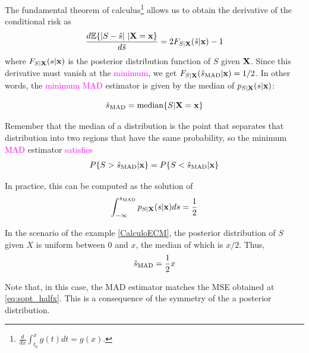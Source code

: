 The fundamental theorem of calculus\footnote{$\frac{d}{d x} \int_{t_0}^x g(t) dt = g(x)$.} allows us to obtain the derivative of the conditional risk as
\begin{equation}
\frac{d \mathbb{E}\{|S - \hat s|~|{\bf X} = {\bf x} \}}{d \hat s} 
    = 2 F_{S|{\bf X}}(\hat s|{\bf x}) - 1
\end{equation}
where $F_{S|{\bf X}}(s|{\bf x})$ is the posterior distribution function of $S$ given ${\bf X}$. Since this derivative must vanish at the \textcolor{magenta}{minimum}, we get $F_{S|{\bf X}}(\hat s_{\text{MAD}}|{\bf x}) = 1/2$. In other words, the \textcolor{magenta}{minimum MAD} estimator is given by the median of $p_{S|{\bf X}}(s|{\bf x})$:

\begin{framed}
\begin{equation}
\label{ec:estimador_MAD_final}
\hat s_{\text{MAD}} = \text{median}\{S|{\bf X} ={\bf x}\}
\end{equation}
\end{framed}

Remember that the median of a distribution is the point that separates that distribution into two regions that have the same probability, so the minimum \textcolor{magenta}{MAD} estimator \textcolor{magenta}{satisfies}
\textcolor{magenta}{\begin{align}
P\{S > \hat{s}_\text{MAD} |{\bf x}\} = P\{S < \hat{s}_\text{MAD} |{\bf x}\}
\end{align}}

In practice, this can be computed as the solution of
\begin{align}
\int_{-\infty}^{\hat{s}_\text{MAD}} p_{S|{\bf X}}(s|{\bf x}) ds = \frac12
\end{align}


\begin{example}

In the scenario of the example \ref{CalculoECM}, the posterior distribution of $S$ given $X$ is uniform between 0 and $x$, the median of which is $x/2$. Thus,
\begin{align}
\label{ec:estimador_MSE_finalej}
\hat{s}_\text{MAD} = \frac{1}{2} x 
\end{align}

Note that, in this case, the MAD estimator matches the MSE obtained at \eqref{eq:sopt_halfx}. This is a consequence of the symmetry of the a posterior distribution.
\end{example}



